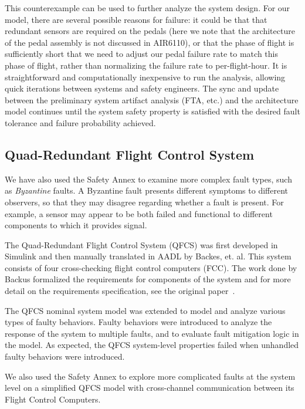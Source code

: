 This counterexample can be used to further analyze the system design.  For our model, there are several possible reasons for failure: it could be that that redundant sensors are required on the pedals (here we note that the architecture of the pedal assembly is not discussed in AIR6110), or that the phase of flight is sufficiently short that we need to adjust our pedal failure rate to match this phase of flight, rather than normalizing the failure rate to per-flight-hour.  It is straightforward and computationally inexpensive to run the analysis, allowing quick iterations between systems and safety engineers. The sync and update between the preliminary system artifact analysis (FTA, etc.) and the architecture model continues until the system safety property is satisfied with the desired fault tolerance and failure probability achieved.

\subsection{Quad-Redundant Flight Control System}
\label{subsec:qrfc_case_study}
We have also used the Safety Annex to examine more complex fault types, such as {\em Byzantine} faults.  A Byzantine fault presents different symptoms to different observers, so that they may disagree regarding whether a fault is present. For example, a sensor may appear to be both failed and functional to different components to which it provides signal. 

The Quad-Redundant Flight Control System (QFCS) was first developed in Simulink and then manually translated in AADL by Backes, et. al. This system consists of four cross-checking flight control computers (FCC). The work done by Backus formalized the requirements for components of the system and for more detail on the requirements specification, see the original paper~\cite{QFCS15:backes}. 

The QFCS nominal system model was extended to model and analyze various types of faulty behaviors. Faulty behaviors were introduced to analyze the response of the system to multiple faults, and to evaluate fault mitigation logic in the model. As expected, the QFCS system-level properties failed when unhandled faulty behaviors were introduced.

We also used the Safety Annex to explore more complicated faults at the system level on a simplified QFCS model with cross-channel communication between its Flight Control Computers.

